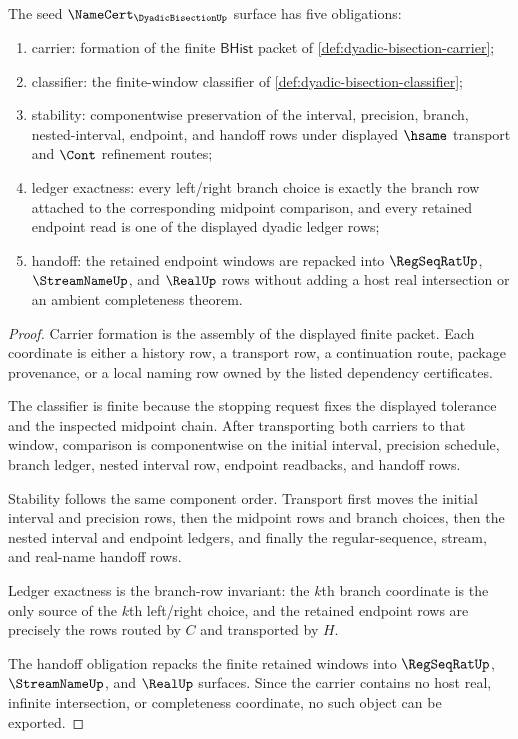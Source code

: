 \begin{theorem}
\label{thm:dyadic-bisection-namecert-obligations}
The seed $\NameCert_{\DyadicBisectionUp}$ surface has five obligations:
\begin{enumerate}
\item carrier: formation of the finite $\mathsf{BHist}$ packet of \autoref{def:dyadic-bisection-carrier};
\item classifier: the finite-window classifier of \autoref{def:dyadic-bisection-classifier};
\item stability: componentwise preservation of the interval, precision, branch, nested-interval, endpoint, and handoff rows under displayed $\hsame$ transport and $\Cont$ refinement routes;
\item ledger exactness: every left/right branch choice is exactly the branch row attached to the corresponding midpoint comparison, and every retained endpoint read is one of the displayed dyadic ledger rows;
\item handoff: the retained endpoint windows are repacked into $\RegSeqRatUp$, $\StreamNameUp$, and $\RealUp$ rows without adding a host real intersection or an ambient completeness theorem.
\end{enumerate}
\end{theorem}
\begin{proof}
Carrier formation is the assembly of the displayed finite packet. Each coordinate is either a history row, a transport row, a continuation route, package provenance, or a local naming row owned by the listed dependency certificates.

The classifier is finite because the stopping request fixes the displayed tolerance and the inspected midpoint chain. After transporting both carriers to that window, comparison is componentwise on the initial interval, precision schedule, branch ledger, nested interval row, endpoint readbacks, and handoff rows.

Stability follows the same component order. Transport first moves the initial interval and precision rows, then the midpoint rows and branch choices, then the nested interval and endpoint ledgers, and finally the regular-sequence, stream, and real-name handoff rows.

Ledger exactness is the branch-row invariant: the $k$th branch coordinate is the only source of the $k$th left/right choice, and the retained endpoint rows are precisely the rows routed by $C$ and transported by $H$.

The handoff obligation repacks the finite retained windows into $\RegSeqRatUp$, $\StreamNameUp$, and $\RealUp$ surfaces. Since the carrier contains no host real, infinite intersection, or completeness coordinate, no such object can be exported.
\end{proof}

